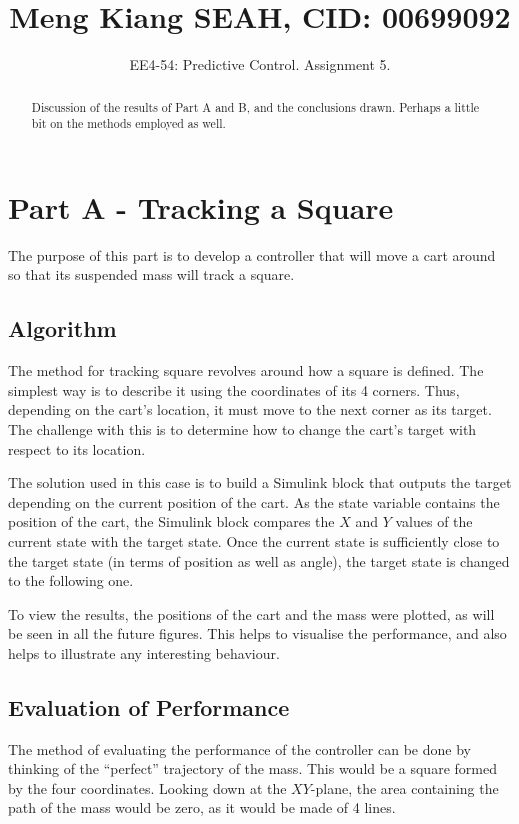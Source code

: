 \documentclass[letterpaper, 10 pt, conference]{ieeeconf} %
\title{\LARGE \bf
Meng Kiang SEAH, CID: 00699092
}
\author{EE4-54: Predictive Control. Assignment 5. %
}
\begin{document}
\maketitle
\thispagestyle{empty}
\pagestyle{empty}


\begin{abstract}
Discussion of the results of Part A and B, and the conclusions drawn. Perhaps a little bit on the methods employed as well.
\end{abstract}


\section{Part A - Tracking a Square}
The purpose of this part is to develop a controller that will move a cart around so that its suspended mass will track a square.

\subsection{Algorithm}
The method for tracking square revolves around how a square is defined. The simplest way is to describe it using the coordinates of its 4 corners. Thus, depending on the cart's location, it must move to the next corner as its target. The challenge with this is to determine how to change the cart's target with respect to its location.

The solution used in this case is to build a Simulink block that outputs the target depending on the current position of the cart. As the state variable contains the position of the cart, the Simulink block compares the $X$ and $Y$ values of the current state with the target state. Once the current state is sufficiently close to the target state (in terms of position as well as angle), the target state is changed to the following one.

To view the results, the positions of the cart and the mass were plotted, as will be seen in all the future figures. This helps to visualise the performance, and also helps to illustrate any interesting behaviour.

\subsection{Evaluation of Performance}\label{sec:error}
The method of evaluating the performance of the controller can be done by thinking of the ``perfect'' trajectory of the mass. This would be a square formed by the four coordinates. Looking down at the $XY$-plane, the area containing the path of the mass would be zero, as it would be made of 4 lines.
\end{document}
